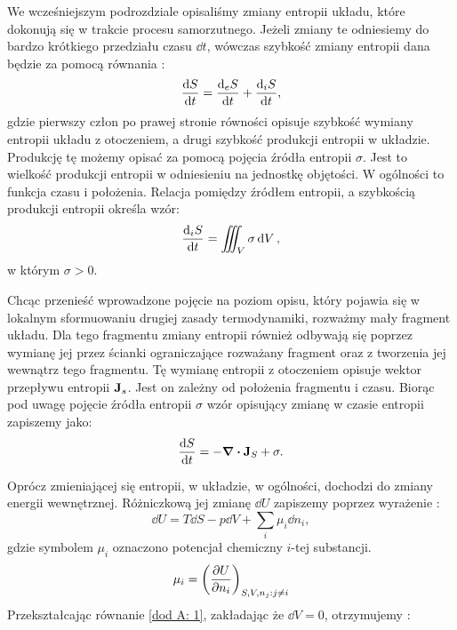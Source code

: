 \documentclass[10pt, a4paper, twoside, onecolumn]{article}
\numberwithin{equation}{section}
\begin{document}
	We wcześniejszym podrozdziale opisaliśmy zmiany entropii układu, które dokonują się w trakcie procesu samorzutnego. Jeżeli zmiany te odniesiemy do bardzo krótkiego przedziału czasu \(\dd{t}\), wówczas szybkość zmiany entropii dana będzie za pomocą równania \cite{mazur, prigogine}:
	\begin{equation}
		\dv{S}{t} = \dv{_{e}S}{t} + \dv{_{i}S}{t},
	\end{equation}
	gdzie pierwszy człon po prawej stronie równości opisuje szybkość wymiany entropii układu z otoczeniem, a drugi szybkość produkcji entropii w układzie. Produkcję tę możemy opisać za pomocą pojęcia źródła entropii \(\sigma\). Jest to wielkość produkcji entropii w odniesieniu na jednostkę objętości. W ogólności to funkcja czasu i położenia. Relacja pomiędzy źródłem entropii, a szybkością produkcji entropii określa wzór:
	\begin{equation}
		\dv{_{i}S}{t} = \iiint_{V}\sigma\dd{V},
	\end{equation}
	w którym \(\sigma>0\). \par
	Chcąc przenieść wprowadzone pojęcie na poziom opisu, który pojawia się w lokalnym sformuowaniu drugiej zasady termodynamiki, rozważmy mały fragment układu. Dla tego fragmentu zmiany entropii również odbywają się poprzez wymianę jej przez ścianki ograniczające rozważany fragment oraz z tworzenia jej wewnątrz tego fragmentu. Tę wymianę entropii z otoczeniem opisuje wektor przepływu entropii \(\vb{J}_{s}\). Jest on zależny od położenia fragmentu i czasu. Biorąc pod uwagę pojęcie źródła entropii \(\sigma\) wzór opisujący zmianę w czasie entropii zapiszemy jako:
	\begin{equation} \label{dod A: 5}
		\dv{S}{t} = -\div{\vb{J}_{S}} + \sigma.
	\end{equation}\par
	Oprócz zmieniającej się entropii, w układzie, w ogólności, dochodzi do zmiany energii wewnętrznej. Różniczkową jej zmianę $\dd{U}$ zapiszemy poprzez wyrażenie \cite{prigogine_modern, landau}:
	\begin{equation}
		\dd{U}=T\dd{S}-p\dd{V}+\sum_{i}\mu_{i}\dd{n_{i}}, \label{dod A: 1}
	\end{equation}
	gdzie symbolem $\mu_{i}$ oznaczono potencjał chemiczny $i$-tej substancji. 
	\begin{equation}
		\mu_{i}=\left(\pdv{U}{n_{i}}\right)_{S, V, n_{j}: j\neq i}
	\end{equation}
	Przekształcając równanie \eqref{dod A: 1}, zakładając że $\dd{V}=0$, otrzymujemy \cite{pigon1}:
\end{document}
